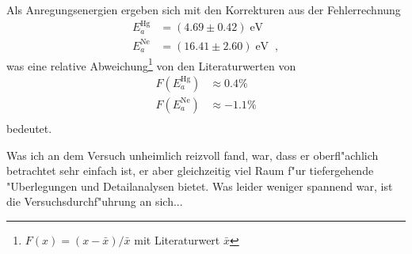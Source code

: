 \documentclass[a4paper,12pt]{article}
\newcommand{\abs}[0]{\bigskip\noindent}
\begin{document}
Als Anregungsenergien ergeben sich mit den Korrekturen aus der Fehlerrechnung
\begin{align*}
	E_a^\text{Hg} &= (4.69 \pm 0.42) \operatorname{eV}\\
	E_a^\text{Ne} &= (16.41 \pm 2.60)\operatorname{eV} \;,
\end{align*}
was eine relative Abweichung\footnote{$F(x) = (x-\bar x)/\bar x$ mit Literaturwert $\bar x$} von den Literaturwerten von 
\begin{align*}
	F( E_a^\text{Hg} ) &\approx 0.4 \% \\
	F( E_a^\text{Ne} ) &\approx -1.1 \% \\
\end{align*}
bedeutet.


\abs
Was ich an dem Versuch unheimlich reizvoll fand, war, dass er oberfl"achlich betrachtet sehr einfach ist, er aber gleichzeitig viel Raum f"ur tiefergehende "Uberlegungen und Detailanalysen bietet. Was leider weniger spannend war, ist die Versuchsdurchf"uhrung an sich...









 
 
 
 
 
 
 
 
\end{document}
